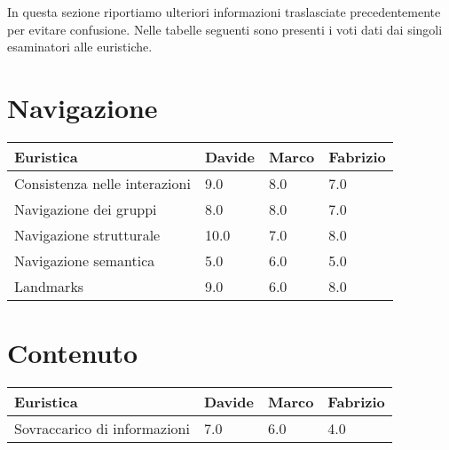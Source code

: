 In questa sezione riportiamo ulteriori informazioni traslasciate precedentemente
per evitare confusione. Nelle tabelle seguenti sono presenti i voti dati dai
singoli esaminatori alle euristiche.

    \section{Navigazione}
    \begin{table}[H]
        \begin{tabular}{|l|l|l|l|}
            \hline \textbf{Euristica} & \textbf{Davide} & \textbf{Marco} &
            \textbf{Fabrizio}\\ \hline
            Consistenza nelle interazioni           & 9.0   & 8.0   & 7.0   \\ \hline
            Navigazione dei gruppi                  & 8.0   & 8.0   & 7.0   \\ \hline
            Navigazione strutturale                 & 10.0  & 7.0   & 8.0   \\ \hline
            Navigazione semantica                   & 5.0   & 6.0   & 5.0   \\ \hline
            Landmarks                               & 9.0   & 6.0   & 8.0   \\ \hline
            \end{tabular}
        \end{table}

    \section{Contenuto}
    \begin{table}[H]
        \begin{tabular}{|l|l|l|l|}
        \hline \textbf{Euristica} & \textbf{Davide} & \textbf{Marco} &
        \textbf{Fabrizio} \\ \hline
        Sovraccarico di informazioni    & 7.0   & 6.0   & 4.0   \\ \hline

        \end{tabular}
        \end{table}

